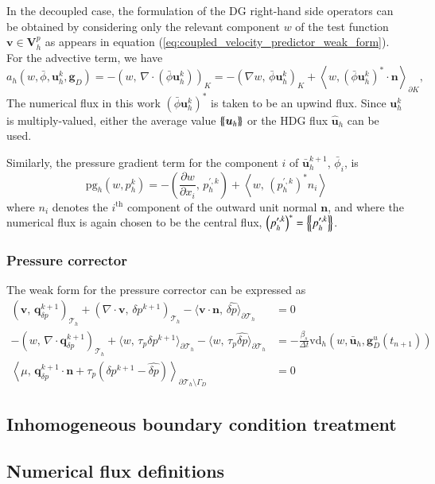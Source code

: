 In the decoupled case, the formulation of the DG right-hand side operators can be obtained by considering only the relevant component $w$ of the test function $\bm{v}\in \bm{V}_h^p$ as appears in equation (\ref{eq:coupled_velocity_predictor_weak_form}). 
For the advective term, we have 
\begin{equation}
  a_h(w,\bar{\phi}, \bm{u}_h^k, \bm{g}_D) 
  = -\left(w,\, \nabla \cdot \left( \bar{\phi}\bm{u}_h^k \right)\right)_K
   = - \left(\nabla w,\, \bar{\phi}\bm{u}^k_h\right)_K
   + \left\langle w, \left(\bar{\phi}\bm{u}_h^k\right)^* \cdot\bm{n} \right\rangle_{\partial K},
\end{equation}
The numerical flux in this work $\left(\bar{\phi}\bm{u}_h^k\right)^*$ is taken to be an upwind flux.
Since $\bm{u}_h^k$ is multiply-valued, either the average value $\left\{\!\left\{\bm{u}_h\right\}\!\right\}$ or the HDG flux $\hat{\bm{u}}_h$ can be used.

Similarly, the pressure gradient term for the component $i$ of $\bar{\bm{u}}_h^{k+1}$, $\bar{\phi}_i$, is
\begin{equation}
  \text{pg}_h\left(w,p_h^k\right) = 
    - \left(\frac{\partial w}{\partial x_i},\, p^{\prime,k}_h\right)
    + \left\langle w,\, \left(p^{\prime, k}_h\right)^*n_i \right\rangle
\end{equation}
where $n_i$ denotes the $i^{\text{th}}$ component of the outward unit normal $\bm{n}$, and where the numerical flux is again chosen to be the central flux, $\left(p^{\prime, k}_h\right)^* = \left\{\!\left\{p_h^{\prime,k}\right\}\!\right\}$.

\subsubsection{Pressure corrector}%
The weak form for the pressure corrector can be expressed as 
\begin{equation}
\begin{aligned}
(\bm{v},\,  \bm{q}_{\delta p}^{k+1})_{\mathcal{T}_h}
+ ( \nabla \cdot \bm{v} ,\, \delta p^{k+1})_{\mathcal{T}_h}
- \langle \bm{v}\cdot\bm{n} ,\, \widehat{\delta p} \rangle_{\partial \mathcal{T}_h} &= 0 \\
-(w ,\, \nabla \cdot \bm{q}_{\delta p}^{k+1})_{\mathcal{T}_h}
+ \langle w,\, \tau_p \delta p^{k+1}\rangle_{\partial \mathcal{T}_h} 
- \langle w,\, \tau_p \widehat{\delta p} \rangle_{\partial \mathcal{T}_h} 
&= - \frac{\beta_s}{\Delta t} \text{vd}_h(w,\bar{\bm{u}}_h, \bm{g}_D^u(t_{n+1}))  \\
\left\langle \mu ,\, \bm{q}_{\delta p}^{k+1} \cdot\bm{n} + \tau_p(\delta p^{k+1} - \widehat{\delta p})
\right\rangle_{\partial \mathcal{T}_h \setminus \Gamma_D} &= 0 
\end{aligned}
\end{equation}



\subsection{Inhomogeneous boundary condition treatment}
\subsection{Numerical flux definitions}
